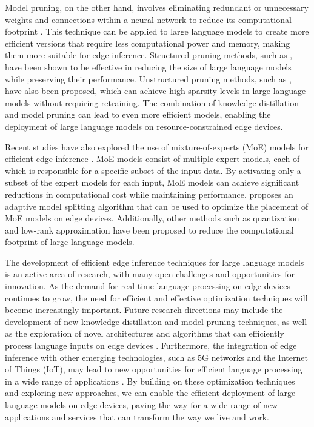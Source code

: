 \documentclass[11pt,a4paper]{article}
\begin{document}
Model pruning, on the other hand, involves eliminating redundant or unnecessary weights and connections within a neural network to reduce its computational footprint \cite{doi:10.18653/v1/d18-1153}. This technique can be applied to large language models to create more efficient versions that require less computational power and memory, making them more suitable for edge inference. Structured pruning methods, such as \cite{doi:10.18653/v1/2020.emnlp-main.496}, have been shown to be effective in reducing the size of large language models while preserving their performance. Unstructured pruning methods, such as \cite{arxiv:2301.00774}, have also been proposed, which can achieve high sparsity levels in large language models without requiring retraining. The combination of knowledge distillation and model pruning can lead to even more efficient models, enabling the deployment of large language models on resource-constrained edge devices.

Recent studies have also explored the use of mixture-of-experts (MoE) models for efficient edge inference \cite{doi:10.18653/v1/2022.emnlp-main.804}. MoE models consist of multiple expert models, each of which is responsible for a specific subset of the input data. By activating only a subset of the expert models for each input, MoE models can achieve significant reductions in computational cost while maintaining performance. \cite{doi:10.1109/twc.2022.3165824} proposes an adaptive model splitting algorithm that can be used to optimize the placement of MoE models on edge devices. Additionally, other methods such as quantization \cite{doi:10.1609/aaai.v38i12.29237} and low-rank approximation \cite{arxiv:2601.17112} have been proposed to reduce the computational footprint of large language models.

The development of efficient edge inference techniques for large language models is an active area of research, with many open challenges and opportunities for innovation. As the demand for real-time language processing on edge devices continues to grow, the need for efficient and effective optimization techniques will become increasingly important. Future research directions may include the development of new knowledge distillation and model pruning techniques, as well as the exploration of novel architectures and algorithms that can efficiently process language inputs on edge devices \cite{doi:10.1609/aaai.v37i9.26255}. Furthermore, the integration of edge inference with other emerging technologies, such as 5G networks and the Internet of Things (IoT), may lead to new opportunities for efficient language processing in a wide range of applications \cite{arxiv:2405.18377}. By building on these optimization techniques and exploring new approaches, we can enable the efficient deployment of large language models on edge devices, paving the way for a wide range of new applications and services that can transform the way we live and work.
\end{document}
